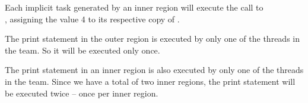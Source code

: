 Each implicit task generated by an inner  region will execute 
the call to\\ , assigning the value 4 to its respective 
copy of .

The print statement in the outer  region is executed by only one 
of the threads in the team. So it will be executed only once.

The print statement in an inner  region is also executed by only 
one of the threads in the team. Since we have a total of two inner  
regions, the print statement will be executed twice -- once per inner  
region.

\pagebreak
{}


